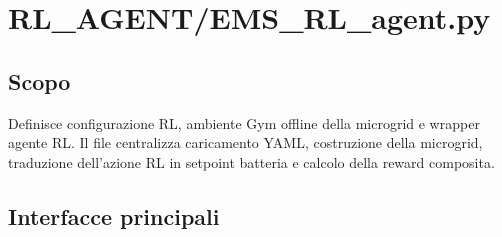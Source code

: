 ﻿\section{RL\_AGENT/EMS\_RL\_agent.py}

\subsection*{Scopo}
Definisce configurazione RL, ambiente Gym offline della microgrid e wrapper agente RL.
Il file centralizza caricamento YAML, costruzione della microgrid, traduzione
dell'azione RL in setpoint batteria e calcolo della reward composita.

\subsection*{Interfacce principali}
